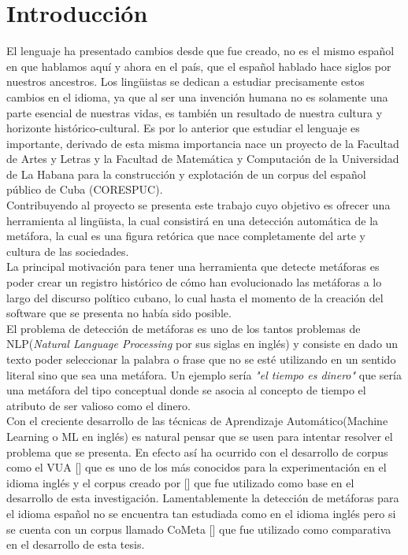 \chapter*{Introducción}\label{chapter:introduction}
El lenguaje ha presentado cambios desde que fue creado, no es el mismo español en que hablamos aquí y ahora en el país, que el español hablado hace siglos por nuestros ancestros. Los lingüistas se dedican a estudiar precisamente estos cambios en el idioma, ya que al ser una invención humana no es solamente una parte esencial de nuestras vidas, es también un resultado de nuestra cultura y horizonte histórico-cultural.
Es por lo anterior que estudiar el lenguaje es importante, derivado de esta misma importancia nace un proyecto de la Facultad de Artes y Letras y la Facultad de Matemática y Computación de la Universidad de La Habana para la construcción y explotación de un corpus del español público de Cuba (CORESPUC).\\
Contribuyendo al proyecto se presenta este trabajo cuyo objetivo es ofrecer una herramienta al lingüista, la cual consistirá en una detección automática de la metáfora, la cual es una figura retórica que nace completamente del arte y cultura de las sociedades. \\
La principal motivación para tener una herramienta que detecte metáforas es poder crear un registro histórico de cómo han evolucionado las metáforas a lo largo del discurso político cubano, lo cual hasta el momento de la creación del software que se presenta no había sido posible. \\
El problema de detección de metáforas es uno de los tantos problemas de NLP(\textit{Natural Language Processing} por sus siglas en inglés) y consiste en dado un texto poder seleccionar la palabra o frase que no se esté utilizando en un sentido literal sino que sea una metáfora. Un ejemplo sería \textit{"el tiempo es dinero"} que sería una metáfora del tipo conceptual donde se asocia al concepto de tiempo el atributo de ser valioso como el dinero.\\ 
Con el creciente desarrollo de las técnicas de Aprendizaje Automático(Machine Learning o ML en inglés) es natural pensar que se usen para intentar resolver el problema que se presenta. En efecto así ha ocurrido con el desarrollo de corpus como el VUA [\cite{LeongEtAl}] que es uno de los más conocidos para la experimentación en el idioma inglés y el corpus creado por [\cite{Tsvetkov}] que fue utilizado como base en el desarrollo de esta investigación. Lamentablemente la detección de metáforas para el idioma español no se encuentra tan estudiada como en el idioma inglés pero si se cuenta con un corpus llamado CoMeta [\cite{Sánchez}] que fue utilizado como comparativa en el desarrollo de esta tesis.\\
